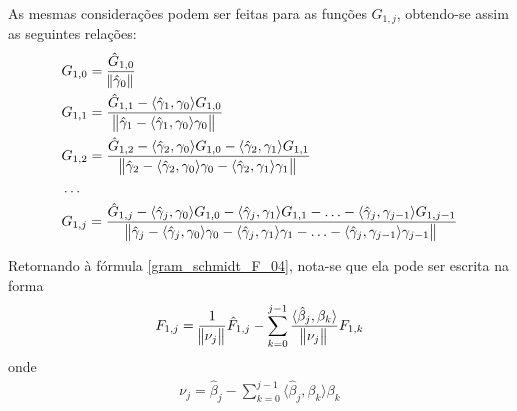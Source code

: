 As mesmas considerações podem ser feitas para as funções $G_{1,j}$, obtendo-se assim as seguintes relações:
\begin{align}
& G_{1,0} = \frac{\hat{G}_{1,0}}{\norm{\hat{\gamma}_0}} \label{gram_schmidt_G_01} \\
& G_{1,1}
=
\frac{\hat{G}_{1,1} - \langle \hat{\gamma}_1, \gamma_0\rangle G_{1,0}}
{\norm{\hat{\gamma}_1 - \langle \hat{\gamma}_1, \gamma_0\rangle\gamma_0}}\label{gram_schmidt_G_02} \\
& G_{1,2}
=
\frac{\hat{G}_{1,2} - \langle \hat{\gamma}_2, \gamma_0\rangle G_{1,0} - \langle \hat{\gamma}_2, \gamma_1\rangle G_{1,1}}
{\norm{\hat{\gamma}_2 - \langle \hat{\gamma}_2, \gamma_0\rangle\gamma_0 - \langle \hat{\gamma}_2, \gamma_1\rangle\gamma_1}} \label{gram_schmidt_G_03} \\
& \ldots \nonumber \\
& G_{1,j}
=
\frac{\hat{G}_{1,j} - \langle \hat{\gamma}_j, \gamma_0\rangle G_{1,0} - \langle \hat{\gamma}_j, \gamma_1\rangle G_{1,1} - \ldots - \langle \hat{\gamma}_j, \gamma_{j - 1}\rangle G_{1,j - 1} }
{\norm{\hat{\gamma}_j - \langle \hat{\gamma}_j, \gamma_0\rangle\gamma_0 - \langle \hat{\gamma}_j, \gamma_1\rangle\gamma_1 - \ldots - \langle \hat{\gamma}_j, \gamma_{j - 1}\rangle\gamma_{j - 1} }} \label{gram_schmidt_G_04}
\end{align}

Retornando à fórmula \eqref{gram_schmidt_F_04}, nota-se que ela pode ser escrita na forma
\begin{align}
F_{1,j} = \frac{1}{\norm{\nu_j}}\hat{F}_{1,j} - \sum_{k=0}^{j-1} \frac{\langle \hat{\beta}_j, \beta_k \rangle}{\norm{\nu_j}} F_{1,k} \label{termo_gram}
\end{align}
onde
\begin{align}
\nu_j = \hat{\beta}_j - \sum_{k = 0}^{j - 1} \langle \hat{\beta}_j, \beta_k\rangle\beta_k
\end{align}

